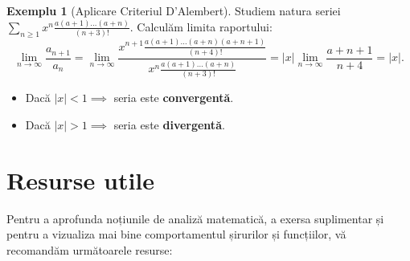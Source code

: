 \documentclass[11pt,a4paper]{article}
\theoremstyle{definition}
\newtheorem{example}[definition]{Exemplu}
\theoremstyle{plain}
\theoremstyle{remark}
\begin{document}
\begin{example}[Aplicare Criteriul D'Alembert]
    Studiem natura seriei \(\displaystyle \sum_{n \ge 1} x^n \frac{a(a+1)\dots(a+n)}{(n+3)!}\).
    Calculăm limita raportului:
    \[
        \lim_{n \to \infty} \frac{a_{n+1}}{a_n} = \lim_{n \to \infty} \frac{x^{n+1} \frac{a(a+1)\dots(a+n)(a+n+1)}{(n+4)!}}{x^n \frac{a(a+1)\dots(a+n)}{(n+3)!}} = |x| \lim_{n \to \infty} \frac{a+n+1}{n+4} = |x|.
    \]
    \begin{itemize}
        \item Dacă $|x| < 1 \implies$ seria este \textbf{convergentă}.
        \item Dacă $|x| > 1 \implies$ seria este \textbf{divergentă}.
    \end{itemize}
\end{example}

\section{Resurse utile}

Pentru a aprofunda noțiunile de analiză matematică, a exersa suplimentar și pentru a vizualiza mai bine comportamentul șirurilor și funcțiilor, vă recomandăm următoarele resurse:
\end{document}
